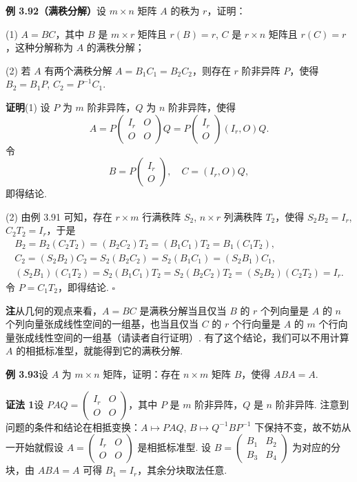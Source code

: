 \documentclass[UTF8,12pt,a4paper,fontset=fandol]{ctexart}
\begin{document}
\noindent\textbf{例 3.92（满秩分解）}\quad 设 $m\times n$ 矩阵 $A$ 的秩为 $r$，证明：

(1) $A=BC$，其中 $B$ 是 $m\times r$ 矩阵且 $r(B)=r$, $C$ 是 $r\times n$ 矩阵且 $r(C)=r$，这种分解称为 $A$ 的满秩分解；

(2) 若 $A$ 有两个满秩分解 $A=B_1C_1=B_2C_2$，则存在 $r$ 阶非异阵 $P$，使得 $B_2=B_1P$, $C_2=P^{-1}C_1$.

\noindent\textbf{证明}\quad (1) 设 $P$ 为 $m$ 阶非异阵，$Q$ 为 $n$ 阶非异阵，使得
\[
A=P\begin{pmatrix}I_r&O\\O&O\end{pmatrix}Q
=P\begin{pmatrix}I_r\\O\end{pmatrix}(I_r,O)Q.
\]
令
\[
B=P\begin{pmatrix}I_r\\O\end{pmatrix},\quad C=(I_r,O)Q,
\]
即得结论.

(2) 由例 3.91 可知，存在 $r\times m$ 行满秩阵 $S_2$, $n\times r$ 列满秩阵 $T_2$，使得 $S_2B_2=I_r$, $C_2T_2=I_r$，于是
\[
\begin{gathered}
B_2=B_2(C_2T_2)=(B_2C_2)T_2=(B_1C_1)T_2=B_1(C_1T_2),\\
C_2=(S_2B_2)C_2=S_2(B_2C_2)=S_2(B_1C_1)=(S_2B_1)C_1,\\
(S_2B_1)(C_1T_2)=S_2(B_1C_1)T_2=S_2(B_2C_2)T_2=(S_2B_2)(C_2T_2)=I_r.
\end{gathered}
\]
令 $P=C_1T_2$，即得结论. $\square$

\noindent\textbf{注}\quad 从几何的观点来看，$A=BC$ 是满秩分解当且仅当 $B$ 的 $r$ 个列向量是 $A$ 的 $n$ 个列向量张成线性空间的一组基，也当且仅当 $C$ 的 $r$ 个行向量是 $A$ 的 $m$ 个行向量张成线性空间的一组基（请读者自行证明）. 有了这个结论，我们可以不用计算 $A$ 的相抵标准型，就能得到它的满秩分解.

\noindent\textbf{例 3.93}\quad 设 $A$ 为 $m\times n$ 矩阵，证明：存在 $n\times m$ 矩阵 $B$，使得 $ABA=A$.

\noindent\textbf{证法 1}\quad 设 $PAQ=\begin{pmatrix}I_r&O\\O&O\end{pmatrix}$，其中 $P$ 是 $m$ 阶非异阵，$Q$ 是 $n$ 阶非异阵. 注意到问题的条件和结论在相抵变换：$A\mapsto PAQ$, $B\mapsto Q^{-1}BP^{-1}$ 下保持不变，故不妨从一开始就假设 $A=\begin{pmatrix}I_r&O\\O&O\end{pmatrix}$ 是相抵标准型. 设 $B=\begin{pmatrix}B_1&B_2\\B_3&B_4\end{pmatrix}$ 为对应的分块，由 $ABA=A$ 可得 $B_1=I_r$，其余分块取法任意.
\end{document}
